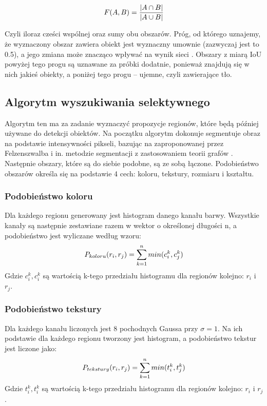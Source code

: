 \documentclass[a4paper,twoside,12pt]{book}
\begin{document}
{{\begin{equation}
F(A,B) = \frac{| A \cap B|}{ |A \cup B|}\\
\end{equation}

Czyli iloraz cześci wspólnej oraz sumy obu obszarów. Próg, od którego uznajemy, że wyznaczony obszar zawiera obiekt jest wyznaczny umownie (zazwyczaj jest to 0.5), a jego zmiana może znacząco wpływać na wynik sieci \cite{girshick2014rich}. Obszary z miarą IoU powyżej tego progu są uznawane za próbki dodatnie, ponieważ znajdują się w nich jakieś obiekty, a poniżej tego progu – ujemne, czyli zawierające tło.}

\subsection{Algorytm wyszukiwania selektywnego}
\label{ss}
{Algorytm ten\cite{uijlings2013selective} ma za zadanie wyznaczyć propozycje regionów, które będą później używane do detekcji obiektów. Na początku algorytm dokonuje segmentuje obraz na podstawie intensywności pikseli, bazując na zaproponowanej przez Felzenszwalba i in. metodzie segmentacji z zastosowaniem teorii grafów \cite{felzenszwalb2004efficient}. Następnie obszary, które są do siebie podobne, są ze sobą łączone. Podobieństwo obszarów określa się na podstawie 4 cech: koloru, tekstury, rozmiaru i kształtu.}
\subsubsection{Podobieństwo koloru}
{Dla każdego regionu generowany jest histogram danego kanału barwy. Wszystkie kanały są następnie zestawiane razem w wektor o określonej długości n, a podobieństwo jest wyliczane według wzoru:
\begin{equation}
P_{koloru}(r_{i},r_{j})= \sum_{k=1}^{n} min(c_{i}^k,c_{j}^k)\\
\end{equation}
Gdzie $c_{i}^k, c_{i}^k$ są wartością k-tego przedziału histogramu dla regionów kolejno: $r_{i}$ i $r_{j}$.
}
\subsubsection{Podobieństwo tekstury}
{
Dla każdego kanału liczonych jest 8 pochodnych Gaussa przy $\sigma=1$. Na ich podstawie dla każdego regionu tworzony jest histogram, a podobieństwo tekstur jest liczone jako:
\begin{equation}
P_{tekstury}(r_{i},r_{j})= \sum_{k=1}^{n} min(t_{i}^k,t_{j}^k)\\
\end{equation}
Gdzie $t_{i}^k,  t_{i}^k$ są wartością k-tego przedziału histogramu dla regionów kolejno: $r_{i}$ i $r_{j}$.

}}
\end{document}
